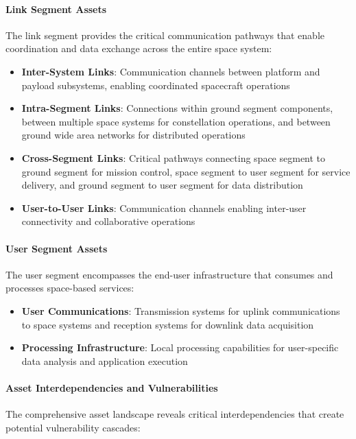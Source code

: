 \documentclass[binding=0.6cm]{sapthesis}
\begin{document}
\paragraph{Link Segment Assets}

The link segment provides the critical communication pathways that enable coordination and data exchange across the entire space system:

\begin{itemize}
    \item \textbf{Inter-System Links}: Communication channels between platform and payload subsystems, enabling coordinated spacecraft operations
    \item \textbf{Intra-Segment Links}: Connections within ground segment components, between multiple space systems for constellation operations, and between ground wide area networks for distributed operations
    \item \textbf{Cross-Segment Links}: Critical pathways connecting space segment to ground segment for mission control, space segment to user segment for service delivery, and ground segment to user segment for data distribution
    \item \textbf{User-to-User Links}: Communication channels enabling inter-user connectivity and collaborative operations
\end{itemize}

\paragraph{User Segment Assets}

The user segment encompasses the end-user infrastructure that consumes and processes space-based services:

\begin{itemize}
    \item \textbf{User Communications}: Transmission systems for uplink communications to space systems and reception systems for downlink data acquisition
    \item \textbf{Processing Infrastructure}: Local processing capabilities for user-specific data analysis and application execution
\end{itemize}

\paragraph{Asset Interdependencies and Vulnerabilities}

The comprehensive asset landscape reveals critical interdependencies that create potential vulnerability cascades:
\end{document}
